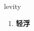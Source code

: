 
\begin{frame}
{\huge levity}
\begin{center}
\begin{enumerate}\Large
  \item \textbf{轻浮}
\end{enumerate}
\end{center}
\end{frame}
